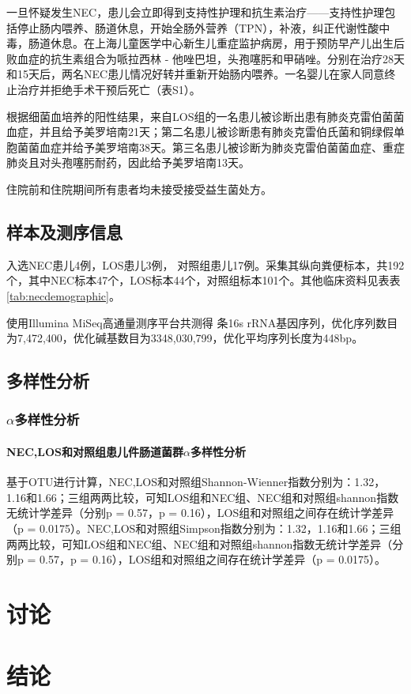   一旦怀疑发生NEC，患儿会立即得到支持性护理和抗生素治疗——支持性护理包括停止肠内喂养、肠道休息，开始全肠外营养（TPN），补液，纠正代谢性酸中毒，肠道休息。在上海儿童医学中心新生儿重症监护病房，用于预防早产儿出生后败血症的抗生素组合为哌拉西林 - 他唑巴坦，头孢噻肟和甲硝唑。分别在治疗28天和15天后，两名NEC患儿情况好转并重新开始肠内喂养。一名婴儿在家人同意终止治疗并拒绝手术干预后死亡（表S1）。

  根据细菌血培养的阳性结果，来自LOS组的一名患儿被诊断出患有肺炎克雷伯菌菌血症，并且给予美罗培南21天；第二名患儿被诊断患有肺炎克雷伯氏菌和铜绿假单胞菌菌血症并给予美罗培南38天。第三名患儿被诊断为肺炎克雷伯菌菌血症、重症肺炎且对头孢噻肟耐药，因此给予美罗培南13天。

  住院前和住院期间所有患者均未接受接受益生菌处方。

  \subsection{样本及测序信息}
  入选NEC患儿4例，LOS患儿3例， 对照组患儿17例。采集其纵向粪便标本，共192个，其中NEC标本47个，LOS标本44个，对照组标本101个。其他临床资料见表表\ref{tab:necdemographic}。

  使用Illumina MiSeq高通量测序平台共测得 条16s rRNA基因序列，优化序列数目为7,472,400，优化碱基数目为3348,030,799，优化平均序列长度为448bp。

  \subsection{多样性分析}
    \subsubsection{$\alpha$多样性分析}
      \paragraph{NEC,LOS和对照组患儿件肠道菌群$\alpha$多样性分析}
      基于OTU进行计算，NEC,LOS和对照组Shannon-Wienner指数分别为：1.32，1.16和1.66；三组两两比较，可知LOS组和NEC组、NEC组和对照组shannon指数无统计学差异（分别p = 0.57，p = 0.16），LOS组和对照组之间存在统计学差异（p = 0.0175）。NEC,LOS和对照组Simpson指数分别为：1.32，1.16和1.66；三组两两比较，可知LOS组和NEC组、NEC组和对照组shannon指数无统计学差异（分别p = 0.57，p = 0.16），LOS组和对照组之间存在统计学差异（p = 0.0175）。



\section{讨论}

\section{结论}
